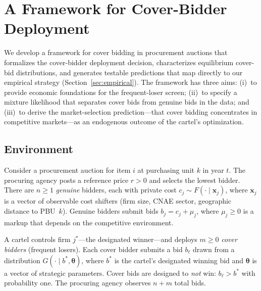 
\section{A Framework for Cover-Bidder Deployment} %
\label{sec:structural}

We develop a framework for cover bidding in procurement auctions
that formalizes the cover-bidder deployment decision, characterizes
equilibrium cover-bid distributions, and generates testable predictions
that map directly to our empirical strategy
(Section~\ref{sec:empirical}). The framework has three aims: (i)~to
provide economic foundations for the frequent-loser screen; (ii)~to
specify a mixture likelihood that separates cover bids from genuine bids
in the data; and (iii)~to derive the market-selection prediction---that
cover bidding concentrates in competitive markets---as an endogenous
outcome of the cartel's optimization.


\subsection{Environment}
\label{sec:environment}

Consider a procurement auction for item $i$ at purchasing unit $k$ in
year $t$. The procuring agency posts a reference price $r > 0$ and
selects the lowest bidder. There are $n \geq 1$ \emph{genuine} bidders,
each with private cost $c_j \sim F(\cdot \mid \mathbf{x}_j)$, where
$\mathbf{x}_j$ is a vector of observable cost shifters (firm size, CNAE
sector, geographic distance to PBU~$k$). Genuine bidders submit bids
$b_j = c_j + \mu_j$, where $\mu_j \geq 0$ is a markup that depends on
the competitive environment.

A cartel controls firm $j^*$---the designated winner---and deploys
$m \geq 0$ \emph{cover bidders} (frequent losers). Each cover bidder
submits a bid $b_\ell$ drawn from a distribution $G(\cdot \mid b^*,
\boldsymbol{\theta})$, where $b^*$ is the cartel's designated winning
bid and $\boldsymbol{\theta}$ is a vector of strategic parameters. Cover
bids are designed to \emph{not} win: $b_\ell > b^*$ with probability
one. The procuring agency observes $n + m$ total bids.

